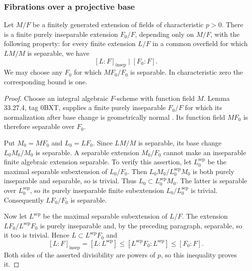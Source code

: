 \subsubsection{Fibrations over a projective base}

\begin{lemma}
\label{D:residual-inseparability-bound}
Let $M/F$ be a finitely generated extension of fields of
characteristic $p>0$.  There is a finite purely inseparable
extension $F_0/F$, depending only on $M/F$, with the following
property: for every finite extension $L/F$ in a common
overfield for which $LM/M$ is separable, we have
\[
                 [L:F]_{\mathrm{insep}}\mid [F_0:F].
\]
We may choose any $F_0$ for which $MF_0/F_0$ is separable.
In characteristic zero the corresponding bound is one.
\end{lemma}
\begin{proof}
Choose an integral algebraic $F$-scheme with function field
$M$.  Lemma 33.27.4, tag 0BXT, supplies a finite purely
inseparable $F_0/F$ for which its normalization after base
change is geometrically normal
\cite{C_StacksLogFibration}.  Its function field $MF_0$
is therefore separable over $F_0$.

Put $M_0=MF_0$ and $L_0=LF_0$.  Since $LM/M$ is separable,
its base change $L_0M_0/M_0$ is separable.  A separable
extension $M_0/F_0$ cannot make an inseparable finite
algebraic extension separable.  To verify this assertion,
let $L_0^{\mathrm{sep}}$ be the maximal separable
subextension of $L_0/F_0$.  Then
$L_0M_0/L_0^{\mathrm{sep}}M_0$ is both purely inseparable
and separable, so is trivial.  Thus
$L_0\subset L_0^{\mathrm{sep}}M_0$.  The latter is separable
over $L_0^{\mathrm{sep}}$, so its purely inseparable finite
subextension $L_0/L_0^{\mathrm{sep}}$ is trivial.
Consequently $LF_0/F_0$ is separable.

Now let $L^{\mathrm{sep}}$ be the maximal separable
subextension of $L/F$.  The extension
$LF_0/L^{\mathrm{sep}}F_0$ is purely inseparable and,
by the preceding paragraph, separable, so it too is
trivial.  Hence $L\subset L^{\mathrm{sep}}F_0$ and
\[
 [L:F]_{\mathrm{insep}}
  =[L:L^{\mathrm{sep}}]
  \leq [L^{\mathrm{sep}}F_0:L^{\mathrm{sep}}]
  \leq [F_0:F].
\]
Both sides of the asserted divisibility are powers of
$p$, so this inequality proves it.
\end{proof}


